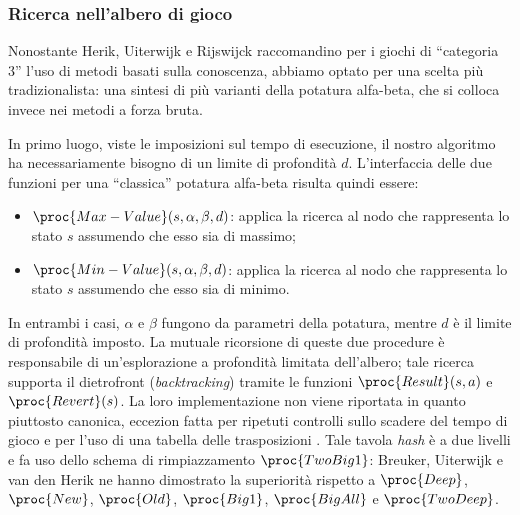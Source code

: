 \documentclass{article}
\begin{document}
\subsubsection{Ricerca nell'albero di gioco}

Nonostante Herik, Uiterwijk e Rijswijck \cite{VANDENHERIK2002277} raccomandino
per i giochi di ``categoria 3'' l'uso di metodi basati sulla conoscenza,
abbiamo optato per una scelta più tradizionalista: una sintesi di più varianti
della potatura alfa-beta, che si colloca invece nei metodi a forza bruta.

\begin{sloppypar}
In primo luogo, viste le imposizioni sul tempo di esecuzione, il nostro
algoritmo ha necessariamente bisogno di un limite di profondità $d$.
L'interfaccia delle due funzioni per una ``classica'' potatura alfa-beta
\cite{at.UBO029034619980101.200--202} risulta quindi essere:
\end{sloppypar}
\begin{itemize}
  \item $\proc{Max-Value}(s, \alpha, \beta, d)$: applica la ricerca
    al nodo che rappresenta lo stato $s$ assumendo che esso sia di massimo;
  \item $\proc{Min-Value}(s, \alpha, \beta, d)$: applica la ricerca
    al nodo che rappresenta lo stato $s$ assumendo che esso sia di minimo.
\end{itemize}
In entrambi i casi, $\alpha$ e $\beta$ fungono da parametri della potatura,
mentre $d$ è il limite di profondità imposto. La mutuale ricorsione di queste
due procedure è responsabile di un'esplorazione a profondità limitata
dell'albero; tale ricerca supporta il dietrofront
\cite{at.UBO029034619980101.108} (\emph{backtracking}) tramite le funzioni
$\proc{Result}(s, a)$ e $\proc{Revert}(s)$.
La loro implementazione non viene riportata in quanto piuttosto canonica,
eccezion fatta per ripetuti controlli sullo scadere del tempo di gioco e per
l'uso di una tabella delle trasposizioni \cite{CN020689428}. Tale tavola
\emph{hash} è a due livelli e fa uso dello schema di rimpiazzamento
$\proc{TwoBig1}$: Breuker, Uiterwijk e van den Herik
\cite{BREUKER-UITERWIJK-VANDENHERIK}
\cite{edsdbl.journals.icga.BreukerUH9619960101} ne hanno dimostrato la
superiorità rispetto a $\proc{Deep}$, $\proc{New}$, $\proc{Old}$, $\proc{Big1}$,
$\proc{BigAll}$ e $\proc{TwoDeep}$.
\end{document}
